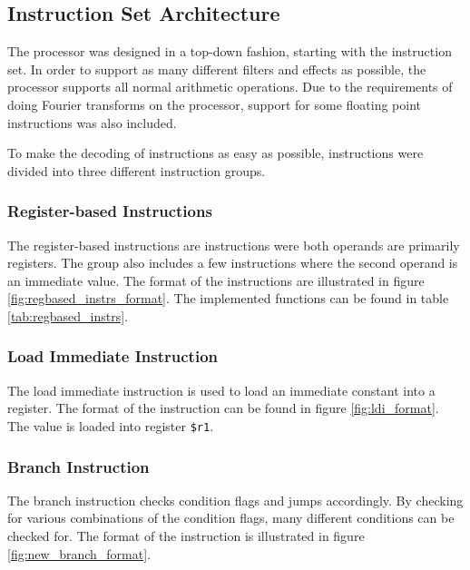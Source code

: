 \subsection{Instruction Set Architecture}\label{section:fpga-isa}

The processor was designed in a top-down fashion, starting with
the instruction set. In order to support as many different filters
and effects as possible, the processor supports all normal arithmetic
operations. Due to the requirements of doing Fourier transforms on the
processor, support for some floating point instructions was also included.

To make the decoding of instructions as easy as possible, instructions
were divided into three different instruction groups.

\subsubsection{Register-based Instructions}

The register-based instructions are instructions were both operands are
primarily registers. The group also includes a few instructions where
the second operand is an immediate value. The format of the
instructions are illustrated in figure \ref{fig:regbased_instrs_format}. The
implemented functions can be found in table \ref{tab:regbased_instrs}.


\FloatBarrier

\FloatBarrier

\subsubsection{Load Immediate Instruction}
The load immediate instruction is used to load an immediate constant into a
register. The format of the instruction can be found in figure
\ref{fig:ldi_format}. The value is loaded into register \texttt{\$r1}.


\FloatBarrier

\subsubsection{Branch Instruction}
The branch instruction checks condition flags and jumps accordingly. By
checking for various combinations of the condition flags, many different
conditions can be checked for. The format of the instruction is illustrated
in figure \ref{fig:new_branch_format}. 

